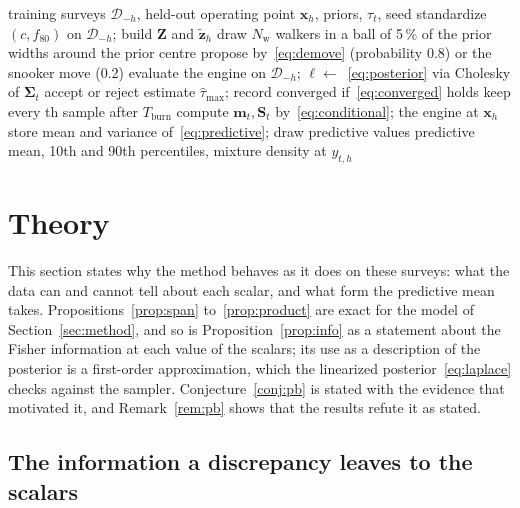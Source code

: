 \documentclass[journal]{IEEEtran}
\newcommand{\pct}{\,\%}
\begin{document}
\begin{algorithm}[!t]
\caption{CrusherBayes: one posterior and the predictive of the held-out survey $h$}
\label{alg:cb}
\begin{algorithmic}[1]
\Require training surveys $\mathcal D_{-h}$, held-out operating point $\mathbf x_h$, priors, $\tau_t$, seed
\State standardize $(c,f_{80})$ on $\mathcal D_{-h}$; build $\mathbf Z$ and $\tilde{\mathbf z}_h$
\State draw $N_{\mathrm w}$ walkers in a ball of 5\pct{} of the prior widths around the prior centre
    \State propose by~\eqref{eq:demove} (probability 0.8) or the snooker move (0.2)
    \State evaluate the engine on $\mathcal D_{-h}$; $\ell\gets$~\eqref{eq:posterior} via Cholesky of $\boldsymbol\Sigma_t$
    \State accept or reject
  \EndFor
\EndFor
\State estimate $\hat\tau_{\max}$; record converged if~\eqref{eq:converged} holds
\State keep every \thin{}th sample after $T_{\mathrm{burn}}$
  \State compute $\mathbf m_t,\mathbf S_t$ by~\eqref{eq:conditional}; the engine at $\mathbf x_h$
  \State store mean and variance of~\eqref{eq:predictive}; draw \draws{} predictive values
\EndFor
\State \Return predictive mean, 10th and 90th percentiles, mixture density at $y_{t,h}$
\end{algorithmic}
\end{algorithm}

\section{Theory}\label{sec:theory}

This section states why the method behaves as it does on these surveys: what the data can and cannot tell about each
scalar, and what form the predictive mean takes. Propositions~\ref{prop:span} to~\ref{prop:product} are exact for the
model of Section~\ref{sec:method}, and so is Proposition~\ref{prop:info} as a statement about the Fisher information at
each value of the scalars; its use as a description of the posterior is a first-order approximation, which the linearized
posterior~\eqref{eq:laplace} checks against the sampler. Conjecture~\ref{conj:pb} is stated with the evidence that
motivated it, and Remark~\ref{rem:pb} shows that the results refute it as stated.

\subsection{The information a discrepancy leaves to the scalars}
\end{document}
